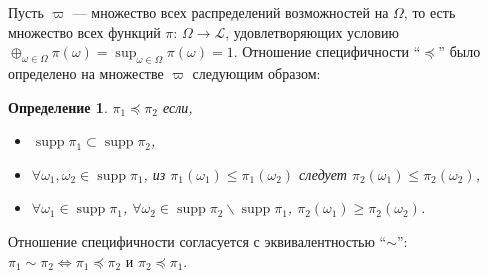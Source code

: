 \documentclass[a4paper, 14pt]{extarticle}
\newcommand{\pplus}{\oplus}
\newtheorem{definition}{Определение}
\DeclareMathOperator{\supp}{supp}
\begin{document}


Пусть $\varpi$ --- множество всех распределений возможностей на $\Omega$, то есть множество всех функций $\pi$: $\Omega \to \mathcal{L}$, удовлетворяющих условию $\pplus_{\omega\in\Omega} \pi(\omega) = \sup_{\omega\in\Omega} \pi(\omega) = 1$. Отношение специфичности ``$\preceq$'' \cite{zubyuk-fss-2018} было определено на множестве $\varpi$ следующим образом: 
\begin{definition}
$\pi_1 \preceq \pi_2$ если,
\begin{itemize}
    \item $\supp \pi_1 \subset \supp \pi_2$,
    \item $\forall \omega_1, \omega_2 \in \supp \pi_1$, из $\pi_1(\omega_1) \leq \pi_1(\omega_2)$ следует $\pi_2(\omega_1) \leq \pi_2(\omega_2)$,
    \item $\forall \omega_1 \in \supp \pi_1$, $\forall \omega_2 \in \supp \pi_2 \backslash \supp \pi_1$, $\pi_2(\omega_1) \geq \pi_2(\omega_2)$. 
\end{itemize}    
\end{definition}
Отношение специфичности согласуется с эквивалентностью ``$\sim$'': $\pi_1 \sim \pi_2 \Leftrightarrow \pi_1 \preceq \pi_2$ и $\pi_2 \preceq \pi_1$.
\end{document}
